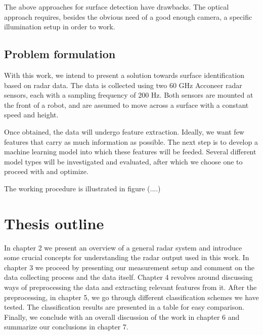 The above approaches for surface detection have drawbacks. The optical approach requires, besides the obvious need of a good enough camera, a specific illumination setup in order to work.  


\subsection{Problem formulation}
With this work, we intend to present a solution towards surface identification based on radar data. The data is collected using two 60 GHz Acconeer radar sensors, each with a sampling frequency of 200 Hz. Both sensors are mounted at the front of a robot, and are assumed to move across a surface with a constant speed and height.

Once obtained, the data will undergo feature extraction. Ideally, we want few features that carry as much information as possible. The next step is to develop a machine learning model into which these features will be feeded. Several different model types will be investigated and evaluated, after which we choose one to proceed with and optimize. 

The working procedure is illustrated in figure (....)


\section{Thesis outline}

In chapter 2 we present an overview of a general radar system and introduce some crucial concepts for understanding the radar output used in this work. In chapter 3 we proceed by presenting our measurement setup and comment on the data collecting process and the data itself. Chapter 4 revolves around discussing ways of preprocessing the data and extracting relevant features from it. After the preprocessing, in chapter 5, we go through different classification schemes we have tested. The classification results are presented in a table for easy comparison. Finally, we conclude with an overall discussion of the work in chapter 6 and summarize our conclusions in chapter 7.

